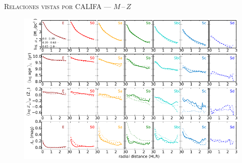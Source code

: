 \documentclass[xcolor=dvipsnames,4pt,hyperref={colorlinks,citecolor=black,linkcolor=black,urlcolor=black}]{beamer}
\begin{document}
\begin{frame}{\textsc{Relaciones vistas por CALIFA --- $M\,$--$\,Z$}}

\begin{figure}
\includegraphics[scale=1]{img/gonzalez2015-17}
\end{figure}
\end{frame}
\end{document}
